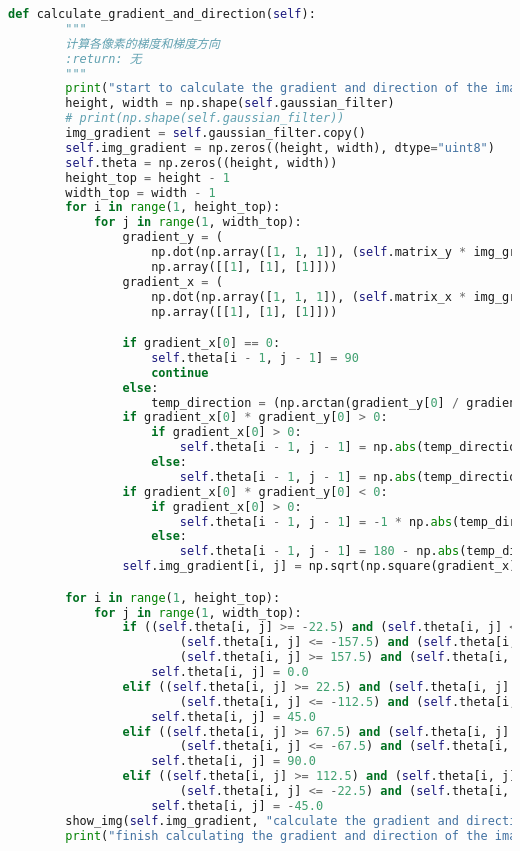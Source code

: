 \documentclass{hitreport}
\begin{document}
\begin{appendices}
\begin{lstlisting}[language=python]
    def calculate_gradient_and_direction(self):
        """
        计算各像素的梯度和梯度方向
        :return: 无
        """
        print("start to calculate the gradient and direction of the image")
        height, width = np.shape(self.gaussian_filter)
        # print(np.shape(self.gaussian_filter))
        img_gradient = self.gaussian_filter.copy()
        self.img_gradient = np.zeros((height, width), dtype="uint8")
        self.theta = np.zeros((height, width))
        height_top = height - 1
        width_top = width - 1
        for i in range(1, height_top):
            for j in range(1, width_top):
                gradient_y = (
                    np.dot(np.array([1, 1, 1]), (self.matrix_y * img_gradient[i - 1:i + 2, j - 1:j + 2]))).dot(
                    np.array([[1], [1], [1]]))
                gradient_x = (
                    np.dot(np.array([1, 1, 1]), (self.matrix_x * img_gradient[i - 1:i + 2, j - 1:j + 2]))).dot(
                    np.array([[1], [1], [1]]))

                if gradient_x[0] == 0:
                    self.theta[i - 1, j - 1] = 90
                    continue
                else:
                    temp_direction = (np.arctan(gradient_y[0] / gradient_x[0])) * 180 / np.pi
                if gradient_x[0] * gradient_y[0] > 0:
                    if gradient_x[0] > 0:
                        self.theta[i - 1, j - 1] = np.abs(temp_direction)
                    else:
                        self.theta[i - 1, j - 1] = np.abs(temp_direction) - 180
                if gradient_x[0] * gradient_y[0] < 0:
                    if gradient_x[0] > 0:
                        self.theta[i - 1, j - 1] = -1 * np.abs(temp_direction)
                    else:
                        self.theta[i - 1, j - 1] = 180 - np.abs(temp_direction)
                self.img_gradient[i, j] = np.sqrt(np.square(gradient_x) + np.square(gradient_y))

        for i in range(1, height_top):
            for j in range(1, width_top):
                if ((self.theta[i, j] >= -22.5) and (self.theta[i, j] < 22.5)) or (
                        (self.theta[i, j] <= -157.5) and (self.theta[i, j] >= -180)) or (
                        (self.theta[i, j] >= 157.5) and (self.theta[i, j] < 180)):
                    self.theta[i, j] = 0.0
                elif ((self.theta[i, j] >= 22.5) and (self.theta[i, j] < 67.5)) or (
                        (self.theta[i, j] <= -112.5) and (self.theta[i, j] >= -157.5)):
                    self.theta[i, j] = 45.0
                elif ((self.theta[i, j] >= 67.5) and (self.theta[i, j] < 112.5)) or (
                        (self.theta[i, j] <= -67.5) and (self.theta[i, j] >= -112.5)):
                    self.theta[i, j] = 90.0
                elif ((self.theta[i, j] >= 112.5) and (self.theta[i, j] < 157.5)) or (
                        (self.theta[i, j] <= -22.5) and (self.theta[i, j] >= -67.5)):
                    self.theta[i, j] = -45.0
        show_img(self.img_gradient, "calculate the gradient and direction of the image")
        print("finish calculating the gradient and direction of the image")


\end{lstlisting}
\end{appendices}
\end{document}
